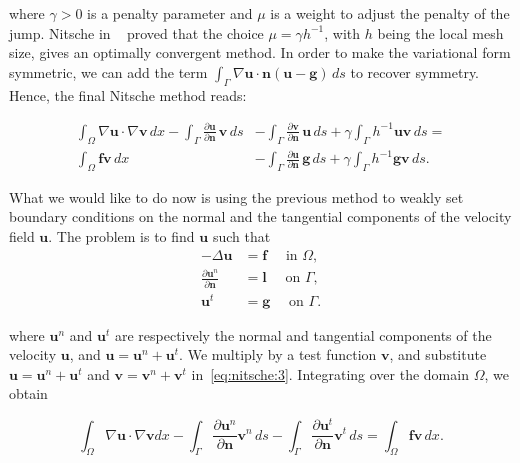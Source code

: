 \documentclass[11pt,a4paper,titlepage]{report}
\begin{document}
where $\gamma > 0$ is a penalty parameter and $\mu$ is a weight to adjust the penalty of the jump. Nitsche in ~\cite{Nitsche1977} proved that the choice $\mu = \gamma h^{-1}$, with $h$ being the local mesh size, gives an optimally convergent method. In order to make the variational form symmetric, we can add the term $\int_{\Gamma} \nabla \mathbf{u} \cdot \mathbf{n} (\mathbf{u}-\mathbf{g}) \, ds$ to recover symmetry. Hence, the final Nitsche method reads:

\begin{align}
\int_{\Omega} \nabla \mathbf{u} \cdot \nabla \mathbf{v} \, dx
- \int_{\Gamma} \frac{\partial \mathbf{u}}{\partial \mathbf{n}} \, \mathbf{v} \, ds
& - \int_{\Gamma} \frac{\partial \mathbf{v}}{\partial \mathbf{n}}\, \mathbf{u} \, ds 
+ \gamma \int_{\Gamma} h^{-1} \mathbf{u} \mathbf{v} \, ds = \\
	\int_{\Omega} \mathbf{f} \mathbf{v} \, dx
&- \int_{\Gamma} \frac{\partial \mathbf{u}}{\partial \mathbf{n}} \, \mathbf{g} \, ds
+ \gamma \int_{\Gamma} h^{-1} \mathbf{g} \mathbf{v} \, ds.
\end{align}

What we would like to do now is using the previous method to weakly set boundary conditions on the normal and the tangential components of the velocity field $\mathbf{u}$. The problem is to find $\mathbf{u}$ such that
\begin{align}
- \Delta \mathbf{u} &= \mathbf{f} \quad \text{ in } \Omega, \\
\label{eq:nitsche:4}
\frac{\partial \mathbf{u}^n}{\partial \mathbf{n}} &= \mathbf{l} \quad \text{ on } \Gamma, \\ 
\mathbf{u}^t &= \mathbf{g} \quad \text{ on } \Gamma.
\end{align}

where $\mathbf{u}^n$ and $\mathbf{u}^t$ are respectively the normal and tangential components of the velocity $\mathbf{u}$, and $\mathbf{u} = \mathbf{u}^n + \mathbf{u}^t$. We multiply by a test function $\mathbf{v}$, and substitute $\mathbf{u} = \mathbf{u}^n + \mathbf{u}^t$ and $\mathbf{v} = \mathbf{v}^n + \mathbf{v}^t$ in~\eqref{eq:nitsche:3}. Integrating over the domain $\Omega$, we obtain

\begin{equation}
\int_\Omega \nabla \mathbf{u} \cdot \nabla \mathbf{v} dx
- \int_{\Gamma} \frac{\partial \mathbf{u}^n}{\partial \mathbf{n}} \mathbf{v}^n \, ds
- \int_{\Gamma} \frac{\partial \mathbf{u}^t}{\partial \mathbf{n}} \mathbf{v}^t \, ds
= \int_\Omega \mathbf{fv} \, dx.
\end{equation}
\end{document}

